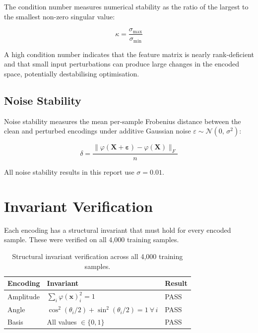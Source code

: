 \documentclass[11pt, a4paper]{article}
\begin{document}
The condition number measures numerical stability as the ratio of the
largest to the smallest non-zero singular value:

\begin{equation}
    \kappa = \frac{\sigma_{\max}}{\sigma_{\min}}
    \label{eq:kappa}
\end{equation}

A high condition number indicates that the feature matrix is nearly
rank-deficient and that small input perturbations can produce large
changes in the encoded space, potentially destabilising optimisation.

\subsection{Noise Stability}

Noise stability measures the mean per-sample Frobenius distance between
the clean and perturbed encodings under additive Gaussian noise
$\varepsilon \sim \mathcal{N}(0,\, \sigma^2)$:

\begin{equation}
    \delta = \frac{\|\varphi(\mathbf{X} + \boldsymbol{\varepsilon}) -
    \varphi(\mathbf{X})\|_F}{n}
    \label{eq:noise}
\end{equation}

All noise stability results in this report use $\sigma = 0.01$.

\section{Invariant Verification}

Each encoding has a structural invariant that must hold for every encoded
sample.  These were verified on all 4,000 training samples.

\begin{table}[h]
\centering
\begin{tabular}{lll}
\toprule
\textbf{Encoding} & \textbf{Invariant} & \textbf{Result} \\
\midrule
Amplitude & $\sum_i \varphi(\mathbf{x})_i^2 = 1$ & \textcolor{green!60!black}{PASS} \\
Angle     & $\cos^2(\theta_i/2) + \sin^2(\theta_i/2) = 1\ \forall\, i$ & \textcolor{green!60!black}{PASS} \\
Basis     & All values $\in \{0, 1\}$ & \textcolor{green!60!black}{PASS} \\
\bottomrule
\end{tabular}
\caption{Structural invariant verification across all 4,000 training samples.}
\end{table}
\end{document}
